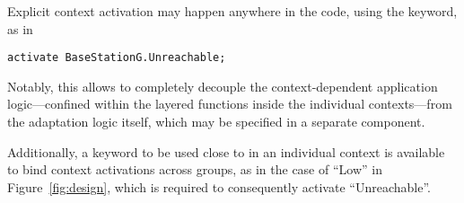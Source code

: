 Explicit context activation may happen anywhere in the code, using the
 keyword, as in
\begin{lstlisting}[language=conesc]
activate BaseStationG.Unreachable;
\end{lstlisting}
Notably, this allows to completely decouple the context-dependent
application logic---confined within the layered functions inside the
individual contexts---from the adaptation logic itself, which may be
specified in a separate component. 

Additionally, a keyword  to be used close to
 in an individual context is available to bind
context activations across groups, as in the case of ``Low'' in
Figure~\ref{fig:design}, which is required to consequently activate
``Unreachable''.

